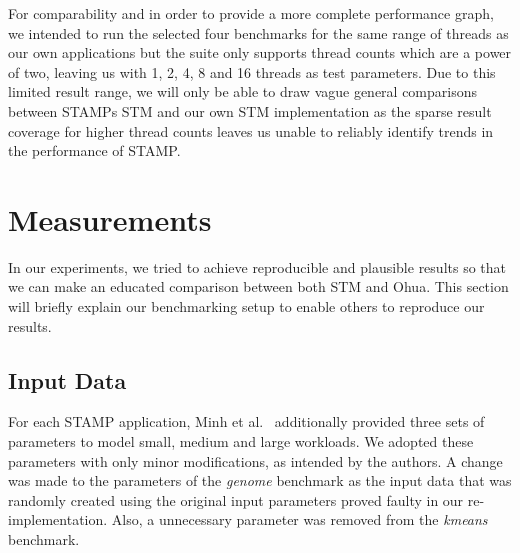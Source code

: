 For comparability and in order to provide a more complete performance graph, we intended to run the selected four benchmarks for the same range of threads as our own applications but the suite only supports thread counts which are a power of two, leaving us with 1, 2, 4, 8 and 16 threads as test parameters.
Due to this limited result range, we will only be able to draw vague general comparisons between STAMPs STM and our own STM implementation as the sparse result coverage for higher thread counts leaves us unable to reliably identify trends in the performance of STAMP.

\section{Measurements}
\label{sec:experiments:measurements}

In our experiments, we tried to achieve reproducible and plausible results so that we can make an educated comparison between both STM and Ohua.
This section will briefly explain our benchmarking setup to enable others to reproduce our results.

\subsection{Input Data}
\label{sec:experiments:measurements:inputs}

For each STAMP application, Minh et al.~\cite{minh2008stamp} additionally provided three sets of parameters to model small, medium and large workloads.
We adopted these parameters with only minor modifications, as intended by the authors.
A change was made to the parameters of the \emph{genome} benchmark as the input data that was randomly created using the original input parameters proved faulty in our re-implementation.
Also, a unnecessary parameter was removed from the \emph{kmeans} benchmark.

